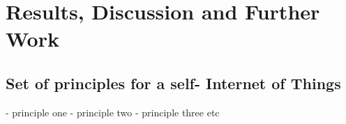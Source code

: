 \documentclass[../main/Self-Stabilization.tex]{subfiles}
\begin{document}
\section{Results, Discussion and Further Work}

\subsection{Set of principles for a self- Internet of Things}
- principle one
- principle two
- principle three
etc
\end{document}

